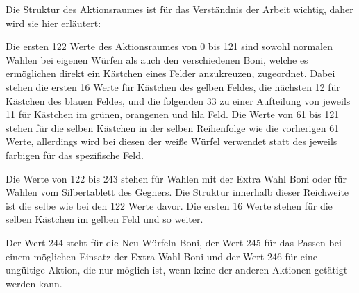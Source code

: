 Die Struktur des Aktionsraumes ist für das Verständnis der Arbeit wichtig, daher wird sie hier erläutert:

Die ersten 122 Werte des Aktionsraumes von 0 bis 121 sind sowohl normalen Wahlen bei eigenen Würfen als auch den verschiedenen Boni, welche es ermöglichen direkt ein Kästchen eines Felder anzukreuzen, zugeordnet. Dabei stehen die ersten 16 Werte für Kästchen des gelben Feldes, die nächsten 12 für Kästchen des blauen Feldes, und die folgenden 33 zu einer Aufteilung von jeweils 11 für Kästchen im grünen, orangenen und lila Feld. Die Werte von 61 bis 121 stehen für die selben Kästchen in der selben Reihenfolge wie die vorherigen 61 Werte, allerdings wird bei diesen der weiße Würfel verwendet statt des jeweils farbigen für das spezifische Feld.

Die Werte von 122 bis 243 stehen für Wahlen mit der Extra Wahl Boni oder für Wahlen vom Silbertablett des Gegners. Die Struktur innerhalb dieser Reichweite ist die selbe wie bei den 122 Werte davor. Die ersten 16 Werte stehen für die selben Kästchen im gelben Feld und so weiter.

Der Wert 244 steht für die Neu Würfeln Boni, der Wert 245 für das Passen bei einem möglichen Einsatz der Extra Wahl Boni und der Wert 246 für eine ungültige Aktion, die nur möglich ist, wenn keine der anderen Aktionen getätigt werden kann.
